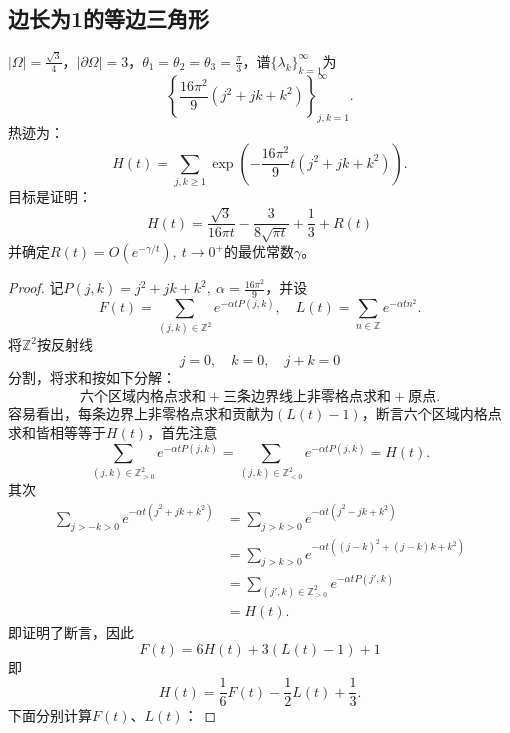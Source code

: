 \documentclass[UTF8,zihao=5,linespread=1.34]{ctexart}
\theoremstyle{cnplain}
\theoremstyle{cnremark}
\begin{document}
\subsection{边长为1的等边三角形}

$|\Omega| = \frac{\sqrt{3}}{4}$，$|\partial\Omega| = 3$，$\theta_{1} = \theta_{2} = \theta_{3} = \frac{\pi}{3}$，谱$\{\lambda_{k}\}_{k=1}^{\infty}$为
\[
\left\{\frac{16\pi^{2}}{9}(j^{2} + jk + k^{2})\right\}_{j,k=1}^{\infty}.
\]
热迹为：
\[
H(t) = \sum_{j,k \geq 1} \exp\left(-\frac{16\pi^{2}}{9} t (j^{2} + jk + k^{2})\right).
\]
目标是证明：
\[
H(t) = \frac{\sqrt{3}}{16\pi t} - \frac{3}{8\sqrt{\pi t}} + \frac{1}{3} + R(t)
\]
并确定$R(t) = O(e^{-\gamma/t}),\ t \rightarrow 0^{+}$的最优常数$\gamma$。

\begin{proof}
记$P(j,k) = j^{2} + jk + k^{2},\ \alpha = \frac{16\pi^{2}}{9}$，并设
\[
F(t) = \sum_{(j,k) \in \mathbb{Z}^{2}} e^{-\alpha t P(j,k)},\quad L(t) = \sum_{n \in \mathbb{Z}} e^{-\alpha t n^{2}}.
\]
将$\mathbb{Z}^{2}$按反射线
\[
j = 0,\quad k = 0,\quad j + k = 0
\]
分割，将求和按如下分解：
\[
\text{六个区域内格点求和} + \text{三条边界线上非零格点求和} + \text{原点}.
\]
容易看出，每条边界上非零格点求和贡献为$(L(t) - 1)$，断言六个区域内格点求和皆相等等于$H(t)$，首先注意
\[
\sum_{(j,k) \in \mathbb{Z}_{>0}^{2}} e^{-\alpha t P(j,k)}
= \sum_{(j,k) \in \mathbb{Z}_{<0}^{2}} e^{-\alpha t P(j,k)} = H(t).
\]
其次
\begin{align*}
\sum_{j > -k > 0} e^{-\alpha t (j^{2} + jk + k^{2})}
&= \sum_{j > k > 0} e^{-\alpha t (j^{2} - jk + k^{2})} \\
&= \sum_{j > k > 0} e^{-\alpha t ((j-k)^{2} + (j-k)k + k^{2})} \\
&= \sum_{(j',k) \in \mathbb{Z}_{>0}^{2}} e^{-\alpha t P(j',k)} \\
&= H(t).
\end{align*}
即证明了断言，因此
\[
F(t) = 6H(t) + 3(L(t) - 1) + 1
\]
即
\[
H(t) = \frac{1}{6}F(t) - \frac{1}{2}L(t) + \frac{1}{3}.
\tag{T}\label{eq:triangle-decomposition}
\]
下面分别计算$F(t)$、$L(t)$：


\end{proof}
\end{document}
